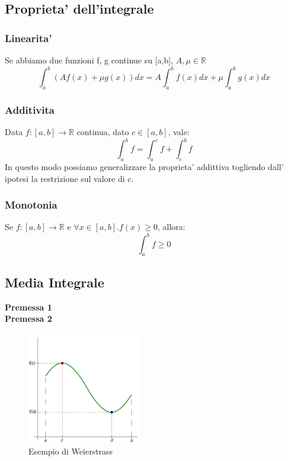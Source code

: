 \documentclass{report}
\begin{document}
\subsection{Proprieta' dell'integrale}
\subsubsection{Linearita'}
Se abbiamo due funzioni f, g continue su [a,b], $A, \mu \in \mathbb{R}$
\[
  \int^b_a (Af(x)+\mu g(x))dx = A\int^b_a f(x)dx + \mu\int^b_a g(x)dx
\]
\subsubsection{Additivita}
Data $f:[a,b]\to\mathbb{R}$ continua, dato $c \in [a,b]$, vale: \label{HA}
\[
\int^b_a f = \int^c_a f + \int^b_c f
\]
In questo modo possiamo generalizzare la proprieta' addittiva togliendo dall' ipotesi la restrizione sul valore di c.
\subsubsection{Monotonia}
Se $f:[a,b]\to\mathbb{R}$ e $\forall x \in [a,b]. f(x) \geq 0$, allora:
\[
\int^b_a f \geq 0 
\]
\subsection{Media Integrale}

\textbf{Premessa 1}\\
\textbf{Premessa 2}\\
\begin{figure}[h!]
    \centering
    \includegraphics[width=50mm]{img/1200px-Extreme_Value_Theorem.svg.png}
    \caption{Esempio di Weierstrass}
  \end{figure}
\end{document}

